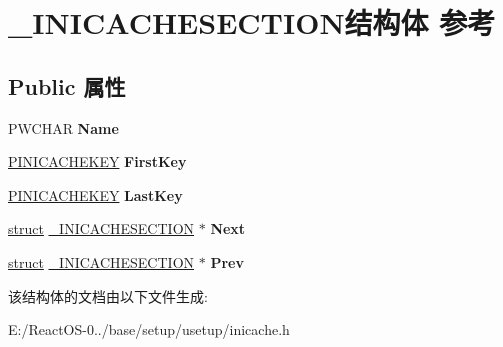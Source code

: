 \hypertarget{struct___i_n_i_c_a_c_h_e_s_e_c_t_i_o_n}{}\section{\+\_\+\+I\+N\+I\+C\+A\+C\+H\+E\+S\+E\+C\+T\+I\+O\+N结构体 参考}
\label{struct___i_n_i_c_a_c_h_e_s_e_c_t_i_o_n}
\subsection*{Public 属性}
\begin{DoxyCompactItemize}
\item 
\mbox{\label{struct___i_n_i_c_a_c_h_e_s_e_c_t_i_o_n_affc059e215ef402cd6c4b7975993fc36}} 
P\+W\+C\+H\+AR {\bfseries Name}
\item 
\mbox{\label{struct___i_n_i_c_a_c_h_e_s_e_c_t_i_o_n_a096d52671a4e94e905a49a6509d1732e}} 
\hyperlink{struct___i_n_i_c_a_c_h_e_k_e_y}{P\+I\+N\+I\+C\+A\+C\+H\+E\+K\+EY} {\bfseries First\+Key}
\item 
\mbox{\label{struct___i_n_i_c_a_c_h_e_s_e_c_t_i_o_n_a8e7e1b8aa7fe48ec81a116cbb90a419b}} 
\hyperlink{struct___i_n_i_c_a_c_h_e_k_e_y}{P\+I\+N\+I\+C\+A\+C\+H\+E\+K\+EY} {\bfseries Last\+Key}
\item 
\mbox{\label{struct___i_n_i_c_a_c_h_e_s_e_c_t_i_o_n_a5bf5edbbb527e7e6442297c49ecac9e9}} 
\hyperlink{interfacestruct}{struct} \hyperlink{struct___i_n_i_c_a_c_h_e_s_e_c_t_i_o_n}{\+\_\+\+I\+N\+I\+C\+A\+C\+H\+E\+S\+E\+C\+T\+I\+ON} $\ast$ {\bfseries Next}
\item 
\mbox{\label{struct___i_n_i_c_a_c_h_e_s_e_c_t_i_o_n_af999ed717a3a39b538c0e36d2ddef01c}} 
\hyperlink{interfacestruct}{struct} \hyperlink{struct___i_n_i_c_a_c_h_e_s_e_c_t_i_o_n}{\+\_\+\+I\+N\+I\+C\+A\+C\+H\+E\+S\+E\+C\+T\+I\+ON} $\ast$ {\bfseries Prev}
\end{DoxyCompactItemize}


该结构体的文档由以下文件生成\+:\begin{DoxyCompactItemize}
\item 
E\+:/\+React\+O\+S-\/0../base/setup/usetup/inicache.\+h\end{DoxyCompactItemize}
